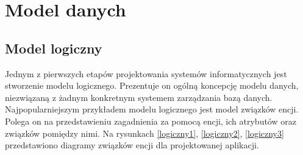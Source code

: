 \chapter{Model danych}
\label{chap5}

\section[Model logiczny][Model logiczny]{Model logiczny}
Jednym z pierwszych etapów projektowania systemów informatycznych jest stworzenie modelu logicznego. Prezentuje on ogólną koncepcję modelu danych, niezwiązaną z żadnym konkretnym systemem zarządzania bazą danych. Najpopularniejszym przykładem modelu logicznego jest model związków encji. Polega on na przedstawieniu zagadnienia za pomocą encji, ich atrybutów oraz związków pomiędzy nimi. Na rysunkach \ref{logiczny1}, \ref{logiczny2}, \ref{logiczny3} przedstawiono diagramy związków encji dla projektowanej aplikacji.

